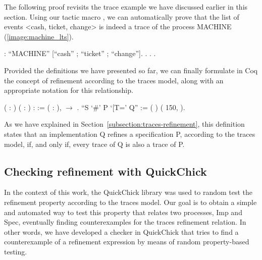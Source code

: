 The following proof revisits the trace example we have discussed earlier in this section. Using our tactic macro , we can automatically prove that the list of events <cash, ticket, change> is indeed a trace of the process MACHINE (\autoref{image:machine_lts}).

\begin{coqdoccode}
	\coqdocnoindent
	  :\coqdoceol
	\coqdocindent{1.00em}
	  ``MACHINE'' [``cash'' ; ``ticket'' ; ``change''].\coqdoceol
	\coqdocnoindent
	. . .\coqdoceol
\end{coqdoccode}

Provided the definitions we have presented so far, we can finally formulate in Coq the concept of refinement according to the traces model, along with an appropriate notation for this relationship.

\begin{coqdoccode}
	\coqdocnoindent
	  ( : ) (  : ) :  :=\coqdoceol
	\coqdocindent{1.00em}
	\coqdockw{\ensuremath{\forall}} ( : ),     \ensuremath{\rightarrow}    .\coqdoceol
	\coqdocemptyline
	\coqdocnoindent
	 ``S `\#' P `[T=' Q'' := (   )\coqdoceol
	\coqdocindent{1.00em}
	(  150,  ).\coqdoceol
\end{coqdoccode}

As we have explained in Section~\ref{subsection:traces-refinement}, this definition states that an implementation Q refines a specification P, according to the traces model, if, and only if, every trace of Q is also a trace of P.

\subsection{Checking refinement with QuickChick}
\label{section:quickchick}

In the context of this work, the QuickChick library was used to random test the refinement property according to the traces model. Our goal is to obtain a simple and automated way to test this property that relates two processes, Imp and Spec, eventually finding counterexamples for the traces refinement relation. In other words, we have developed a checker in QuickChick that tries to find a counterexample of a refinement expression by means of random property-based testing.

